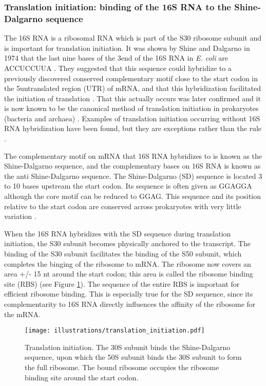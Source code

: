 \subsubsection{Translation initiation: binding of the 16S RNA to the
Shine-Dalgarno sequence}
The 16S RNA is a ribosomal RNA which is part of the S30 ribosome subunit and is
important for translation initiation. It was shown by Shine and Dalgarno in
1974 that the last nine bases of the 3\ppp end of the 16S RNA in \textit{E.
coli} are ACCUCCUUA \cite{shine_3-terminal_1974}. They suggested that this
sequence could hybridize to a previously discovered conserved complementary
motif close to the start codon in the 5\ppp untranslated region (UTR) of mRNA,
and that this hybridization facilitated the initiation of translation
\cite{shine_3-terminal_1974}. That this actually occurs was later confirmed and
it is now known to be the canonical method of translation initiation in
prokaryotes (bacteria and archaea) \cite{nakagawa_dynamic_2010}. Examples of
translation initiation occurring without 16S RNA hybridization have been found,
but they are exceptions rather than the rule \cite{skorski_highly_2006,
boni_non-canonical_2001}.

The complementary motif on mRNA that 16S RNA hybridizes to is known as the
Shine-Dalgarno sequence, and the complementary bases on 16S RNA is known as the
anti Shine-Dalgarno sequence. The Shine-Dalgarno (SD) sequence is located 3 to
10 bases upstream the start codon. Its sequence is often given as GGAGGA
although the core motif can be reduced to GGAG. This sequence and its position
relative to the start codon are conserved across prokaryotes with very little
variation \cite{nakagawa_dynamic_2010}. 

When the 16S RNA hybridizes with the SD sequence during translation initiation,
the S30 subunit becomes physically anchored to the transcript. The binding of
the S30 subunit facilitates the binding of the S50 subunit, which completes the
binging of the ribosome to mRNA. The ribosome now covers an area +/- 15 nt
around the start codon; this area is called the ribosome binding site (RBS)
\cite{kozak_regulation_2005} (see Figure \ref{fig:translation_initiation}). The
sequence of the entire RBS is important for efficient ribosome binding. This is
especially true for the SD sequence, since its complementarity to 16S RNA
directly influences the affinity of the ribosome for the mRNA.

\begin{figure}[htb]
	\begin{center}
		\texttt{[image: illustrations/translation\_initiation.pdf]}
	\end{center}
	\caption{Translation initiation. The 30S subunit binds the Shine-Dalgarno
	sequence, upon which the 50S subunit binds the 30S subunit to form the full
	ribosome. The bound ribosome occupies the ribosome binding site around the
	start codon.}
	\label{fig:translation_initiation}
\end{figure}

